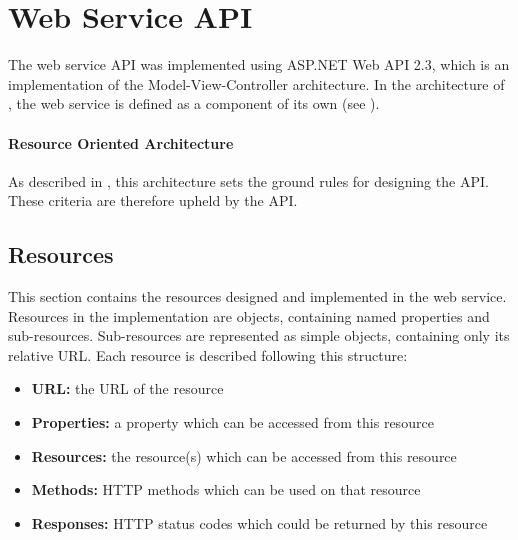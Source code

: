 \section{Web Service API}\label{design:web_service}
The web service API was implemented using ASP.NET Web API 2.3\cite{aspnet_webapi}, which is an implementation of the Model-View-Controller architecture.
In the architecture of \projectname{}, the web service is defined as a component of its own (see ).



\paragraph{Resource Oriented Architecture}
As described in , this architecture sets the ground rules for designing the API.
These criteria are therefore upheld by the API.

\subsection{Resources}\label{webservice:resources}
This section contains the resources designed and implemented in the web service.
Resources in the implementation are objects, containing named properties and sub-resources.
Sub-resources are represented as simple objects, containing only its relative URL.
Each resource is described following this structure:
\begin{itemize}
\item \textbf{URL:} the URL of the resource
\item \textbf{Properties:} a property which can be accessed from this resource
\item \textbf{Resources:} the resource(s) which can be accessed from this resource
\item \textbf{Methods:} HTTP methods which can be used on that resource
\item \textbf{Responses:} HTTP status codes which could be returned by this resource
\end{itemize}


